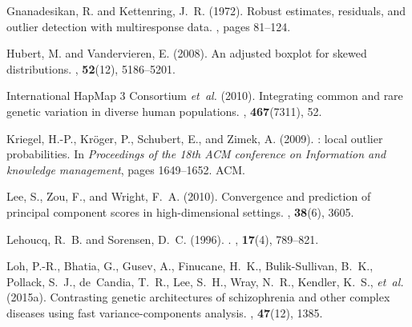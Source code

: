 \documentclass{bioinfo}
\begin{document}
\begin{thebibliography}{}
	Gnanadesikan, R. and Kettenring, J.~R. (1972).
	\newblock Robust estimates, residuals, and outlier detection with multiresponse
	data.
	, pages 81--124.
	
	Hubert, M. and Vandervieren, E. (2008).
	\newblock An adjusted boxplot for skewed distributions.
	, {\bf 52}(12),
	5186--5201.
	
	{International HapMap 3 Consortium} {\em et~al.} (2010).
	\newblock Integrating common and rare genetic variation in diverse human
	populations.
	, {\bf 467}(7311), 52.
	
	Kriegel, H.-P., Kr{\"o}ger, P., Schubert, E., and Zimek, A. (2009).
	: local outlier probabilities.
	\newblock In {\em Proceedings of the 18th {ACM} conference on Information and
		knowledge management\/}, pages 1649--1652. ACM.
	
	Lee, S., Zou, F., and Wright, F.~A. (2010).
	\newblock Convergence and prediction of principal component scores in
	high-dimensional settings.
	, {\bf 38}(6), 3605.
	
	Lehoucq, R.~B. and Sorensen, D.~C. (1996).
	.
	, {\bf
		17}(4), 789--821.
	
	Loh, P.-R., Bhatia, G., Gusev, A., Finucane, H.~K., Bulik-Sullivan, B.~K.,
	Pollack, S.~J., de~Candia, T.~R., Lee, S.~H., Wray, N.~R., Kendler, K.~S.,
	{\em et~al.} (2015a).
	\newblock Contrasting genetic architectures of schizophrenia and other complex
	diseases using fast variance-components analysis.
	, {\bf 47}(12), 1385.
	

\end{thebibliography}
\end{document}

